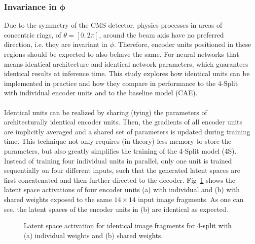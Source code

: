 \documentclass[../../main.tex]{subfiles}
\begin{document}
\subsubsection{Invariance in \texorpdfstring{$\bm{\phi}$}{p}}\label{sec:inv_phi}
Due to the symmetry of the CMS detector, physics processes in areas of concentric rings, of $\theta=[0,2\pi]$, around the beam axis have no preferred direction, i.e. they are invariant in $\phi$. Therefore, encoder units positioned in these regions should be expected to also behave the same. For neural networks that means identical architecture and identical network parameters, which guarantees identical results at inference time. This study explores how identical units can be implemented in practice and how they compare in performance to the 4-Split with individual encoder units and to the baseline model (CAE).\\
\\
Identical units can be realized by sharing (tying) the parameters of architecturally identical encoder units. Then, the gradients of all encoder units are implicitly averaged and a shared set of parameters is updated during training time. This technique not only requires (in theory) less memory to store the parameters, but also greatly simplifies the training of the 4-Split model (4S). Instead of training four individual units in parallel, only one unit is trained sequentially on four different inputs, such that the generated latent spaces are first concatenated and then further directed to the decoder. Fig~\ref{fig:latents4} shows the latent space activations of four encoder units (a) with individual and (b) with shared weights exposed to the same $14\times14$ input image fragments. As one can see, the latent spaces of the encoder units in (b) are identical as expected.\\
\begin{figure}[htp]
	\centering
	\hspace{10mm}
	\caption{Latent space activation for identical image fragments for 4-split with (a) individual weights and (b) shared weights.}
	\label{fig:latents4}
\end{figure}
\\
\end{document}
